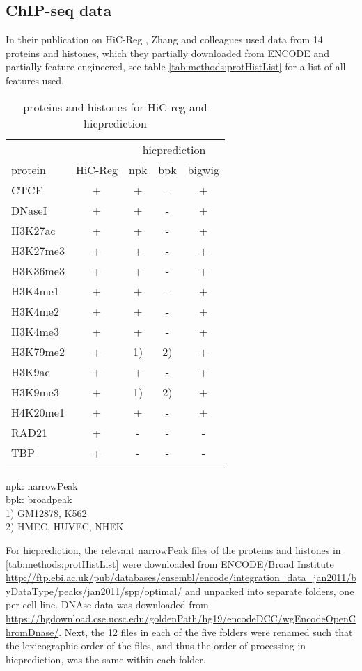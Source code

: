 \subsection{ChIP-seq data} \label{sec:methods:chipseqdata}
In their publication on HiC-Reg \cite{Zhang2019}, Zhang and colleagues used data from 14 proteins and histones, which they partially downloaded from ENCODE and 
partially feature-engineered, see table \autoref{tab:methods:protHistList} for a list of all features used.
\begin{table}[h]
\centering
\begin{minipage}{0.6\textwidth}
 \begin{tabular}{lc@{\hskip 10mm}ccc}
  \hline
	  &	    & \multicolumn{3}{c}{hicprediction}\\	
  protein & HiC-Reg &  npk & bpk & bigwig\\
  \hline
  CTCF		& + & + & - & +\\
  DNaseI	& + & + & - & +\\
  H3K27ac 	& + & + & - & +\\
  H3K27me3 	& + & + & - & +\\
  H3K36me3 	& + & + & - & +\\
  H3K4me1 	& + & + & - & +\\
  H3K4me2 	& + & + & - & +\\
  H3K4me3 	& + & + & - & +\\
  H3K79me2 	& + & 1) & 2) & + \\
  H3K9ac 	& + & + & - & +\\
  H3K9me3 	& + & 1) & 2) & + \\
  H4K20me1 	& + & + & - & +\\
  RAD21 	& + & - & - & -\\
  TBP		& + & - & - & -\\
  \hline\\
 \end{tabular}
\end{minipage}
\begin{minipage}{0.35\textwidth}
 \scriptsize npk: narrowPeak\\ 
 \scriptsize bpk: broadpeak\\
 \scriptsize 1) GM12878, K562\\
 \scriptsize 2) HMEC, HUVEC, NHEK
\end{minipage}
 \caption{proteins and histones for HiC-reg and hicprediction}
 \label{tab:methods:protHistList}
\end{table} 

For hicprediction, the relevant narrowPeak files of the proteins and histones in \autoref{tab:methods:protHistList} were downloaded from ENCODE/Broad Institute 
\url{http://ftp.ebi.ac.uk/pub/databases/ensembl/encode/integration_data_jan2011/byDataType/peaks/jan2011/spp/optimal/} 
and unpacked into separate folders, one per cell line. 
DNAse data was downloaded from \url{ 
https://hgdownload.cse.ucsc.edu/goldenPath/hg19/encodeDCC/wgEncodeOpenChromDnase/}.
Next, the 12 files in each of the five folders were renamed such that the lexicographic order of the files, 
and thus the order of processing in hicprediction, was the same within each folder.

